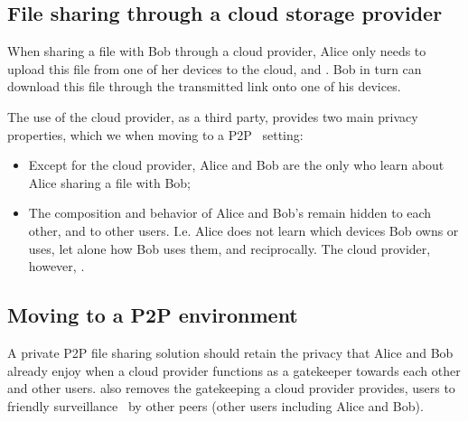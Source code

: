 
\subsection{File sharing through a cloud storage provider}

When sharing a file with Bob through a cloud provider, Alice only needs to upload this file from one of her devices to the cloud, and . Bob in turn can download this file through the transmitted link onto one of his devices.

The use of the cloud provider, as a third party,
provides two main privacy properties, which we  when
moving to a \ac{P2P}~\cite{DevilInMetadata} setting:
\begin{itemize}
\item Except for the cloud provider, Alice and Bob are the only  who learn 
about Alice sharing a file with Bob;  
\item
  The composition and behavior of Alice and Bob's \squad remain hidden to each other, and to other users. I.e. Alice does not learn which devices Bob owns or uses, let alone how Bob uses them, and reciprocally. 
The cloud provider, however, .  
\end{itemize} 

\subsection{Moving to a P2P environment}
A private P2P file sharing solution should retain
the privacy that
Alice and Bob already enjoy when a cloud provider functions
as a gatekeeper towards each other and other users.
 also removes the gatekeeping a cloud provider provides,  users to friendly surveillance~\cite{FriendlySurveillance}
by other peers (other \name users including Alice and Bob). 
 

